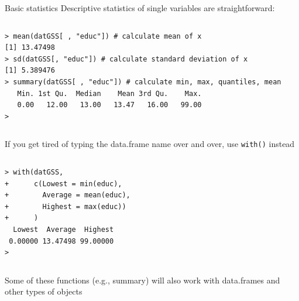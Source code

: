\documentclass[table,smaller]{beamer}
\begin{document}
\begin{frame}[fragile,label=sec-6-1]{Basic statistics}
 Descriptive statistics of single variables are straightforward:
\vspace{-.5em}
\begin{columns}
\begin{block}{}
\begin{verbatim}
> mean(datGSS[ , "educ"]) # calculate mean of x
[1] 13.47498
> sd(datGSS[, "educ"]) # calculate standard deviation of x
[1] 5.389476
> summary(datGSS[ , "educ"]) # calculate min, max, quantiles, mean
   Min. 1st Qu.  Median    Mean 3rd Qu.    Max. 
   0.00   12.00   13.00   13.47   16.00   99.00 
>
\end{verbatim}
\end{block}
\end{columns}
\vspace{.5em}

If you get tired of typing the data.frame name over and over, use \verb~with()~ instead
\vspace{-.5em}
\begin{columns}
\begin{block}{}
\begin{verbatim}
> with(datGSS,
+      c(Lowest = min(educ),
+        Average = mean(educ),
+        Highest = max(educ))
+      )
  Lowest  Average  Highest 
 0.00000 13.47498 99.00000 
>
\end{verbatim}
\end{block}
\end{columns}
\vspace{.5em}

Some of these functions (e.g., summary) will also work with data.frames and other types of objects
\end{frame}
\end{document}
